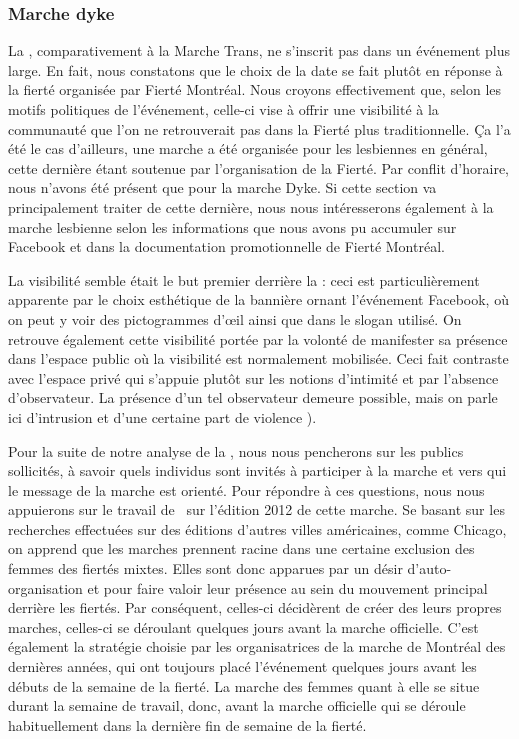 \subsubsection{Marche dyke}
\label{subsubsec:marchedyke}
La \dm{}, comparativement à la Marche Trans, ne s'inscrit pas dans un événement plus large. 
En fait, nous constatons que le choix de la date se fait plutôt en réponse à la fierté organisée par Fierté Montréal. 
Nous croyons effectivement que, selon les motifs politiques de l'événement, celle-ci vise à offrir une visibilité à la communauté \dyke{} que l'on ne retrouverait pas dans la Fierté plus traditionnelle. 
Ça l'a été le cas d'ailleurs, une marche a été organisée pour les lesbiennes en général, cette dernière étant soutenue par l'organisation de la Fierté. 
Par conflit d'horaire, nous n'avons été présent que pour la marche Dyke. 
Si cette section va principalement traiter de cette dernière, nous nous intéresserons également à la marche lesbienne selon les informations que nous avons pu accumuler sur Facebook et dans la documentation promotionnelle de Fierté Montréal.

La visibilité semble était le but premier derrière la \dm{}: ceci est particulièrement apparente par le choix esthétique de la bannière ornant l'événement Facebook, où on peut y voir des pictogrammes d'œil ainsi que dans le slogan utilisé. 
On retrouve également cette visibilité portée par la volonté de manifester sa présence dans l'espace public où la visibilité est normalement mobilisée. 
Ceci fait contraste avec l'espace privé qui s'appuie plutôt sur les notions d'intimité et par l'absence d'observateur. 
La présence d'un tel observateur demeure possible, mais on parle  ici d'intrusion et d'une certaine part de violence ).

Pour la suite de notre analyse de la \dm{}, nous nous pencherons sur les publics sollicités, à savoir quels individus sont invités à participer à la marche et vers qui le message de la marche est orienté. 
Pour répondre à ces questions, nous nous appuierons sur le travail de~\cite{Podmore2015a} sur l'édition 2012 de cette marche. 
Se basant sur les recherches effectuées sur des éditions d'autres villes américaines, comme Chicago, on apprend que les marches \dykes{} prennent racine dans une certaine exclusion des femmes des fiertés mixtes. 
Elles sont donc apparues par un désir d'auto-organisation et pour faire valoir leur présence au sein du mouvement principal derrière les fiertés. 
Par conséquent, celles-ci décidèrent de créer des leurs propres marches, celles-ci se déroulant quelques jours avant la marche officielle. 
C'est également la stratégie choisie par les organisatrices de la marche de Montréal des dernières années, qui ont toujours placé l'événement quelques jours avant les débuts de la semaine de la fierté. 
La marche des femmes quant à elle se situe durant la semaine de travail, donc, avant la marche officielle qui se déroule habituellement dans la dernière fin de semaine de la fierté.

